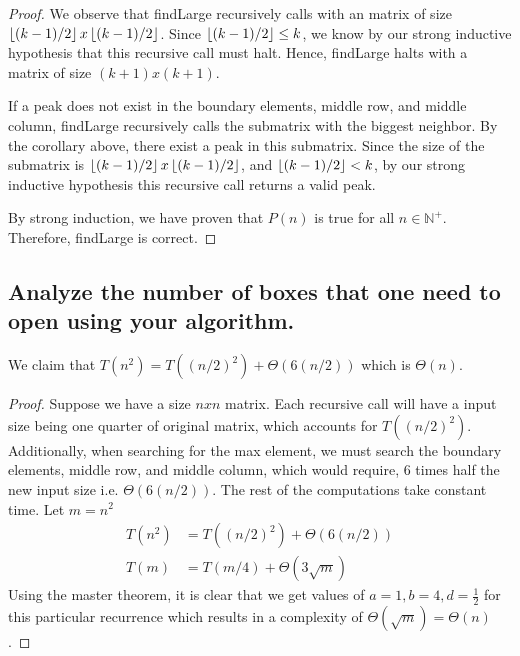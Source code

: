 \documentclass[11pt]{scrartcl}
\begin{document}
\begin{proof}
	\par We observe that findLarge recursively calls with an matrix of size 
	$\left\lfloor (k-1) / 2 \right\rfloor x \left\lfloor (k-1) / 2 \right\rfloor$.
	Since $\left\lfloor (k-1) / 2 \right\rfloor \leq k$, we know by our strong inductive hypothesis that this
	recursive call must halt. Hence, findLarge halts with a matrix of size $(k+1)x(k+1)$.
	
	\par If a peak does not exist in the boundary elements, middle row, and middle column, findLarge 
	recursively calls the submatrix with the biggest neighbor. By the corollary above, there 
	exist a peak in this submatrix. Since the size of the submatrix is $\left\lfloor (k-1) / 2 \right\rfloor x \left\lfloor (k-1) / 2 \right\rfloor$,
	and $\left\lfloor (k-1) / 2 \right\rfloor < k$, by our strong inductive hypothesis this recursive call returns a valid peak.

	\par By strong induction, we have proven that $P(n)$ is true for all $n \in \mathbb{N^{+}}$.
	Therefore, findLarge is correct.
\end{proof}

\subsection{
	Analyze the number of boxes that one need to open using your algorithm.
}
We claim that $T(n^2) = T((n/2)^2) + \Theta(6(n/2))$ which is $\Theta(n)$.
\begin{proof}
	Suppose we have a size $nxn$ matrix. Each recursive call will have a input size being one quarter
	of original matrix, which accounts for $T((n/2)^2)$. Additionally, when searching for the max element, 
	we must search the boundary elements, middle row, and middle column, which would require, 6 times half the new input size
	i.e. $\Theta(6(n/2))$.
	The rest of the computations take constant time. Let $m = n^2$
	\begin{align*}
		T(n^2) & = T((n/2)^2) + \Theta(6(n/2)) \\
		T(m) & = T(m/4) + \Theta(3\sqrt{m})
	\end{align*}
	Using the master theorem, it is clear that we get values of $a = 1, b = 4, d = \frac12$ for this particular
	recurrence which results in a complexity of $\Theta(\sqrt{m}) = \Theta(n)$.
\end{proof}
\iffalse
Suppose we have a $nxn$ matrix.
A call to our algorithm will result in single recursive call
with its input sized being halfed. Additionally, for each
recursive call, we must search the boundary elements, middle row, and middle column,
which would require, 6 times half the input size time. 
\begin{align*}
	T(n^2) & = T(\frac{n}{2}x\frac{n}{2}) + \Theta(6(\frac{n}{2}))\\
	T(n) & = T(\frac{n}{4}) + \Theta(3\sqrt{n})
\end{align*}
\fi
\end{document}

